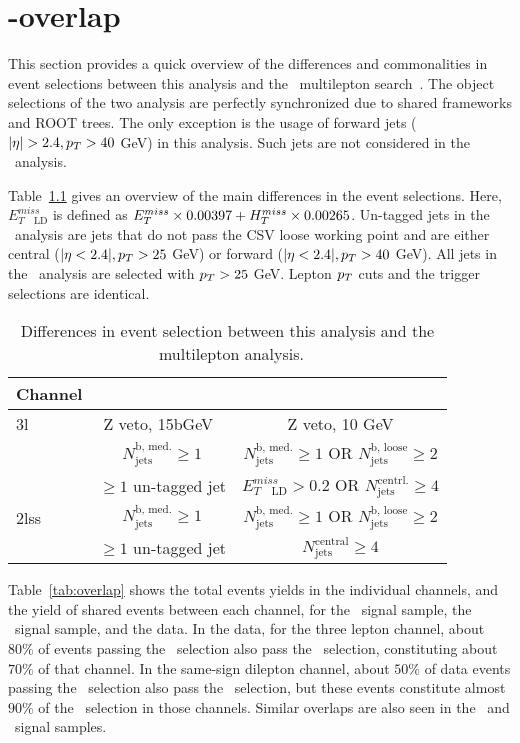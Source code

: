 \chapter{\tHq-\ttH overlap}\label{app:overlap}
This section provides a quick overview of the differences and commonalities in event selections between this analysis and the \ttH\ multilepton search~\cite{CMS_AN_2017-029}.
The object selections of the two analysis are perfectly synchronized due to shared frameworks and ROOT trees.
The only exception is the usage of forward jets ($|\eta|>2.4, \pt>40$ GeV) in this analysis.
Such jets are not considered in the \ttH\ analysis.

Table~\ref{tab:seldiffs} gives an overview of the main differences in the event selections.
Here, $E^{miss}_{T\quad\text{LD}}$ is defined as $E_T^{miss}\times0.00397 + H_{T}^{miss}\times0.00265$.
Un-tagged jets in the \tHq\ analysis are jets that do not pass the CSV loose working point and are either central ($|\eta<2.4|, p_T>25$ GeV) or forward ($|\eta<2.4|, p_T>40$ GeV).
All jets in the \ttH\ analysis are selected with $p_T>25$ GeV.
Lepton $p_T$ cuts and the trigger selections are identical.

\begin{table}[h!]
\centering
\begin{tabular}{l|cc}
	Channel & \tHq & \ttH \\ \hline
	3l   & Z veto, 15bGeV\ & Z veto, 10 GeV\\\ 
	     & $N_\text{jets}^\text{b, med.}\geq1$ &
	       $N_\text{jets}^\text{b, med.}\geq1$ OR
	       $N_\text{jets}^\text{b, loose}\geq2$ \\\ 
	     & $\geq1$ un-tagged jet & $E^{miss}_{T\quad\text{LD}}> 0.2$ OR $N_\text{jets}^\text{centrl.}\geq4$ \\ \hline
	2lss & $N_\text{jets}^\text{b, med.}\geq1$ &
	       $N_\text{jets}^\text{b, med.}\geq1$ OR
	       $N_\text{jets}^\text{b, loose}\geq2$ \\\ 
	     & $\geq1$ un-tagged jet & $N_\text{jets}^\text{central}\geq4$ \\
\end{tabular}
\caption{Differences in event selection between this analysis and the \ttH\ multilepton analysis.}\label{tab:seldiffs}
\end{table}

Table~\ref{tab:overlap} shows the total events yields in the individual channels, and the yield of shared events between each channel, for the \tHq\ signal sample, the \ttH\ signal sample, and the data.
In the data, for the three lepton channel, about $80\%$ of events passing the \tHq\ selection also pass the \ttH\ selection, constituting about $70\%$ of that channel.
In the same-sign dilepton channel, about $50\%$ of data events passing the \tHq\ selection also pass the \ttH\ selection, but these events constitute almost $90\%$ of the \ttH\ selection in those channels.
Similar overlaps are also seen in the \tHq\ and \ttH\ signal samples.

